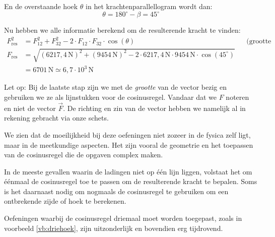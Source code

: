 \documentclass{ximera}
\begin{document}
\begin{example}[foldable=true,title={Voorbeeld: Drie ladingen niet op een lijn}]
\begin{solution}
        En de overstaande hoek $\theta$ in het krachtenparallellogram wordt dan:
        \begin{equation*}
            \theta = 180^\circ - \beta = 45^\circ
        \end{equation*}
        
        Nu hebben we alle informatie berekend om de resulterende kracht te vinden:
        \begin{align*}
            F^{2}_{\text{res}} &= F^{2}_{12} + F^{2}_{32} - 2 \cdot F_{12} \cdot F_{32} \cdot \cos(\theta) && \text{(grootte vectoren via cosinusregel)} \\
            F_{\text{res}} &= \sqrt{(6217{,}4 \, \mathrm{N})^{2} + (9454 \, \mathrm{N})^{2} - 2 \cdot 6217{,}4 \, \mathrm{N} \cdot 9454 \, \mathrm{N} \cdot \cos(45^\circ)} \\
            &= 6701 \, \mathrm{N} \simeq 6{,}7 \cdot 10^3 \, \mathrm{N}
        \end{align*}
        
        \begin{hint}
            Let op: Bij de laatste stap zijn we met de \textit{grootte} van de vector bezig en gebruiken we ze als lijnstukken voor de cosinusregel. Vandaar dat we $F$ noteren en niet de vector $\vec{F}$. De richting en zin van de vector hebben we namelijk al in rekening gebracht via onze schets.
        \end{hint}
    \end{solution}
\end{example}

We zien dat de moeilijkheid bij deze oefeningen niet zozeer in de fysica zelf ligt, maar in de meetkundige aspecten. Het zijn vooral de geometrie en het toepassen van de cosinusregel die de opgaven complex maken.

In de meeste gevallen waarin de ladingen niet op één lijn liggen, volstaat het om éénmaal de cosinusregel toe te passen om de resulterende kracht te bepalen. Soms is het daarnaast nodig om nogmaals de cosinusregel te gebruiken om een ontbrekende zijde of hoek te berekenen.

Oefeningen waarbij de cosinusregel driemaal moet worden toegepast, zoals in voorbeeld \ref{vb:driehoek}, zijn uitzonderlijk en bovendien erg tijdrovend.
\end{document}
